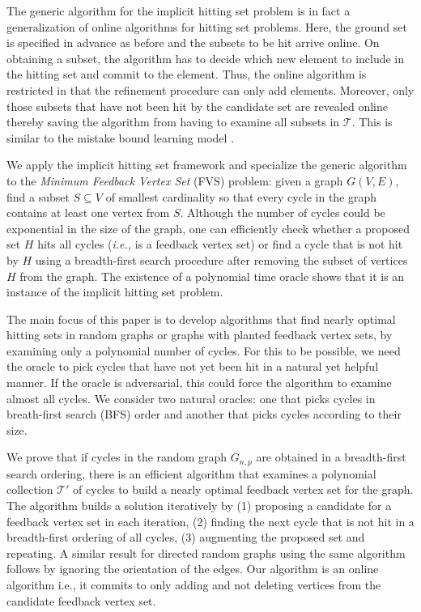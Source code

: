 \documentclass[11pt]{article}
\def\T{\mathcal{T}}
\begin{document}
The generic algorithm for the implicit hitting set problem is in fact a generalization of online algorithms for hitting set problems. Here, the ground set is specified in advance as before and the subsets to be hit arrive online. On obtaining a subset, the algorithm has to decide which new element to include in the hitting set and commit to the element. Thus, the online algorithm is restricted in that the refinement procedure can only add elements.  Moreover, only those subsets that have not been hit by the candidate set are revealed online thereby saving the algorithm from having to examine all subsets in $\T$. This is similar to the mistake bound learning model \cite{littlestone88}.



We apply the implicit hitting set framework and specialize the generic
algorithm to the \emph{Minimum Feedback Vertex Set} (FVS) problem: given a
graph $G(V,E)$, find a subset $S\subseteq V$ of smallest cardinality so that
every cycle in the graph contains at least one vertex from $S$. Although the
number of cycles could be exponential in the size of the graph, one can
efficiently check whether a proposed set $H$ hits all cycles ({\it i.e.,} is a
feedback vertex set) or find a cycle that is not hit by $H$ using a
breadth-first search procedure after removing the subset of vertices $H$ from
the graph. The existence of a polynomial time oracle shows that it is an
instance of the implicit hitting set problem.

The main focus of this paper is to develop algorithms that find nearly optimal hitting sets in random graphs or graphs with planted feedback vertex sets, by examining only a polynomial number of cycles. For this to be possible, we need the oracle to pick cycles that have not yet been hit in a natural yet helpful manner. If the oracle is adversarial, this could force the algorithm to examine almost all cycles. We consider two natural oracles: one that picks cycles in breath-first search (BFS) order and another that picks cycles according to their size.

We prove that if cycles in the random graph $G_{n,p}$ are obtained in a breadth-first search ordering, there is an efficient algorithm that examines a polynomial collection $\T'$ of cycles to build a nearly optimal feedback vertex set for the graph. The algorithm builds a solution iteratively by (1) proposing a candidate for a feedback vertex set in each iteration, (2) finding the next cycle that is not hit in a breadth-first ordering of all cycles, (3) augmenting the proposed set and repeating. A similar result for directed random graphs using the same algorithm follows by ignoring the orientation of the edges. Our algorithm is an online algorithm i.e., it commits to only adding and not deleting vertices from the candidate feedback vertex set.
\end{document}
